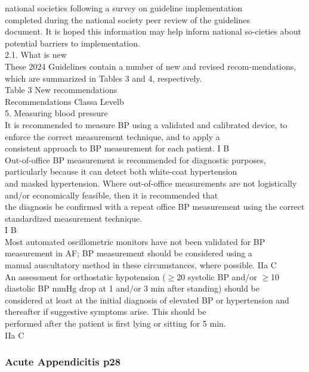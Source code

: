 \documentclass[bs, english]{stthesis}
\begin{document}
national  societies following a survey on guideline  implementation\\
completed during the national society peer review of the guidelines\\
document. It is hoped this information may help inform national so-cieties about potential barriers to implementation.\\
2.1. What is new\\
These 2024 Guidelines contain a number of new and revised recom-mendations, which are summarized in Tables 3 and 4, respectively.\\
Table 3  New recommendations\\
Recommendations Classa Levelb\\
5. Measuring blood pressure\\
It is recommended to measure BP using a validated and calibrated device, to enforce the correct measurement technique, and to apply a\\
consistent approach to BP measurement for each patient. I B\\
Out-of-office BP measurement is recommended for diagnostic purposes, particularly because it can detect both white-coat hypertension\\
and masked hypertension. Where out-of-office measurements are not logistically and/or economically feasible, then it is recommended that\\
the diagnosis be confirmed with a repeat office BP measurement using the correct standardized measurement technique.\\
I B\\
Most automated oscillometric monitors have not been validated for BP measurement in AF; BP measurement should be considered using a\\
manual auscultatory method in these circumstances, where possible. IIa C\\
An assessment for orthostatic hypotension ($\ge$20 systolic BP and/or $\ge$10 diastolic BP mmHg drop at 1 and/or 3 min after standing) should be\\
considered at least at the initial diagnosis of elevated BP or hypertension and thereafter if suggestive symptoms arise. This should be\\
performed after the patient is first lying or sitting for 5 min.\\
IIa C\\

\subsubsection*{Acute Appendicitis p28}
\end{document}
